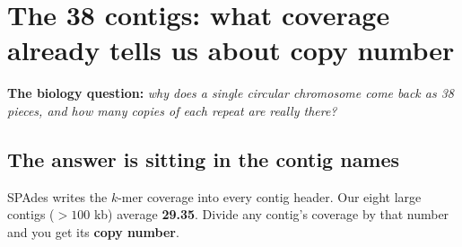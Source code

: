 \clearpage
\renewcommand{\sectioncolor}{sand}
\section{The 38 contigs: what coverage already tells us about copy number}

\noindent\textbf{\color{sand}The biology question:} \emph{why does a single circular chromosome come
back as 38 pieces, and how many copies of each repeat are really there?}

\subsection{The answer is sitting in the contig names}

SPAdes writes the $k$-mer coverage into every contig header. Our eight large contigs
($>100$ kb) average \textbf{29.35}. Divide any contig's coverage by that number and you get its
\textbf{copy number}.

